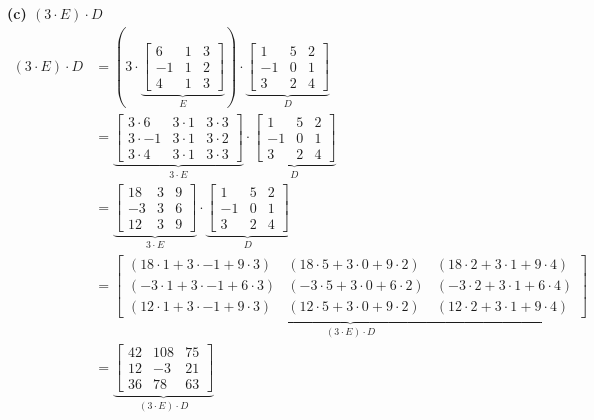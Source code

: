 \documentclass[a4paper,12pt]{article}
\begin{document}
\textbf{(c) $(3 \cdot E) \cdot D$}
\begin{align*}
    (3 \cdot E) \cdot D&= (3 \cdot
    \underbrace{
    \begin{bmatrix}
        6 & 1 & 3\\
        -1 & 1 & 2\\
        4 & 1 & 3
    \end{bmatrix}}_{E})
    \cdot
    \underbrace{
    \begin{bmatrix}
        1 & 5 & 2\\
        -1 & 0 & 1\\
        3 & 2 & 4
    \end{bmatrix}}_{D} \\
    &=
    \underbrace{
    \begin{bmatrix}
        3 \cdot 6 & 3 \cdot 1 & 3 \cdot 3\\
        3 \cdot -1 & 3 \cdot 1 & 3 \cdot 2\\
        3 \cdot 4 & 3 \cdot 1 & 3 \cdot 3
    \end{bmatrix}}_{3 \cdot E}
    \cdot
    \underbrace{
    \begin{bmatrix}
        1 & 5 & 2\\
        -1 & 0 & 1\\
        3 & 2 & 4
    \end{bmatrix}}_{D} \\
    &=
    \underbrace{
    \begin{bmatrix}
        18 & 3 & 9\\
        -3 & 3 & 6\\
        12 & 3 & 9
    \end{bmatrix}}_{3 \cdot E}
    \cdot
    \underbrace{
    \begin{bmatrix}
        1 & 5 & 2\\
        -1 & 0 & 1\\
        3 & 2 & 4
    \end{bmatrix}}_{D} \\
    &=
    \underbrace{
    \begin{bmatrix}
        (18\cdot 1 + 3 \cdot -1 + 9 \cdot 3) & (18 \cdot 5 + 3 \cdot 0 + 9 \cdot 2) & (18 \cdot 2 + 3 \cdot 1 + 9 \cdot 4)\\
        (-3\cdot 1 + 3 \cdot -1 + 6 \cdot 3) & (-3 \cdot 5 + 3 \cdot 0 + 6 \cdot 2) & (-3 \cdot 2 + 3 \cdot 1 + 6 \cdot 4)\\
        (12\cdot 1 + 3 \cdot -1 + 9 \cdot 3) & (12 \cdot 5 + 3 \cdot 0 + 9 \cdot 2) & (12 \cdot 2 + 3 \cdot 1 + 9 \cdot 4)
    \end{bmatrix}}_{(3 \cdot E) \cdot D} \\
    &=
    \underbrace{
    \begin{bmatrix}
        42 & 108 & 75\\
        12 & -3 & 21\\
        36 & 78 & 63
    \end{bmatrix}}_{(3 \cdot E) \cdot D} 
\end{align*}
\end{document}
